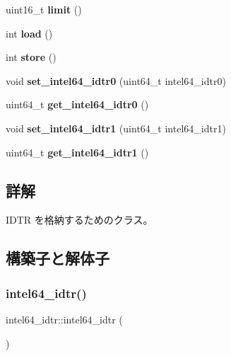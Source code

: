 \begin{DoxyCompactItemize}
uint16\+\_\+t {\bfseries limit} ()
\item 
\hypertarget{classintel64__idtr_ad2dd8ad29b2239ca05382dd9af4d1fec}{}\label{classintel64__idtr_ad2dd8ad29b2239ca05382dd9af4d1fec} 
int {\bfseries load} ()
\item 
\hypertarget{classintel64__idtr_ab02ac72c6686406a2aa9906af7852b51}{}\label{classintel64__idtr_ab02ac72c6686406a2aa9906af7852b51} 
int {\bfseries store} ()
\item 
\hypertarget{classintel64__idtr_a4d0a1adf0406e4000260d81ed3f0173b}{}\label{classintel64__idtr_a4d0a1adf0406e4000260d81ed3f0173b} 
void {\bfseries set\+\_\+intel64\+\_\+idtr0} (uint64\+\_\+t intel64\+\_\+idtr0)
\item 
\hypertarget{classintel64__idtr_a498816d83051bc4706fd990e9055ba31}{}\label{classintel64__idtr_a498816d83051bc4706fd990e9055ba31} 
uint64\+\_\+t {\bfseries get\+\_\+intel64\+\_\+idtr0} ()
\item 
\hypertarget{classintel64__idtr_a1306cbebbff931ddd635dd80e104442f}{}\label{classintel64__idtr_a1306cbebbff931ddd635dd80e104442f} 
void {\bfseries set\+\_\+intel64\+\_\+idtr1} (uint64\+\_\+t intel64\+\_\+idtr1)
\item 
\hypertarget{classintel64__idtr_aacafe385f9727f8948ca0c6208040742}{}\label{classintel64__idtr_aacafe385f9727f8948ca0c6208040742} 
uint64\+\_\+t {\bfseries get\+\_\+intel64\+\_\+idtr1} ()
\end{DoxyCompactItemize}


\subsection{詳解}
I\+D\+TR を格納するためのクラス。 

\subsection{構築子と解体子}
\hypertarget{classintel64__idtr_a280b4fe680812df6d0cca1feeb34ec6e}{}\label{classintel64__idtr_a280b4fe680812df6d0cca1feeb34ec6e} 
\subsubsection{\texorpdfstring{intel64\+\_\+idtr()}{intel64\_idtr()}\hspace{0.1cm}{\footnotesize\ttfamily [1/3]}}
{\footnotesize\ttfamily intel64\+\_\+idtr\+::intel64\+\_\+idtr (\begin{DoxyParamCaption}{ }\end{DoxyParamCaption})}

